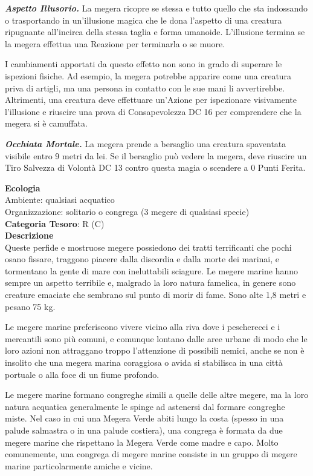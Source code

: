 \begin{multicols}{2}
{\emph{\textbf{Aspetto Illusorio.}} La megera ricopre se stessa e tutto quello che sta indossando o trasportando in un'illusione magica che le dona l'aspetto di una creatura ripugnante all'incirca della stessa taglia e forma umanoide. L'illusione termina se la megera effettua una Reazione per terminarla o se muore.

I cambiamenti apportati da questo effetto non sono in grado di superare le ispezioni fisiche. Ad esempio, la megera potrebbe apparire come una creatura priva di artigli, ma una persona in contatto con le sue mani li avvertirebbe. Altrimenti, una creatura deve effettuare un'Azione per ispezionare visivamente l'illusione e riuscire una prova di Consapevolezza DC 16 per comprendere che la megera si è camuffata.

\emph{\textbf{Occhiata Mortale.}} La megera prende a bersaglio una creatura spaventata visibile entro 9 metri da lei. Se il bersaglio può vedere la megera, deve riuscire un Tiro Salvezza di Volontà DC 13 contro questa magia o scendere a 0 Punti Ferita.

\textbf{Ecologia}\\
Ambiente: qualsiasi acquatico\\
Organizzazione: solitario o congrega (3 megere di qualsiasi specie)\\
\textbf{Categoria Tesoro}: R (C)\\
\textbf{Descrizione}\\
Queste perfide e mostruose megere possiedono dei tratti terrificanti che pochi osano fissare, traggono piacere dalla discordia e dalla morte dei marinai, e tormentano la gente di mare con ineluttabili sciagure. Le megere marine hanno sempre un aspetto terribile e, malgrado la loro natura famelica, in genere sono creature emaciate che sembrano sul punto di morir di fame. Sono alte 1,8 metri e pesano 75 kg.

Le megere marine preferiscono vivere vicino alla riva dove i pescherecci e i mercantili sono più comuni, e comunque lontano dalle aree urbane di modo che le loro azioni non attraggano troppo l'attenzione di possibili nemici, anche se non è insolito che una megera marina coraggiosa o avida si stabilisca in una città portuale o alla foce di un fiume profondo.

Le megere marine formano congreghe simili a quelle delle altre megere, ma la loro natura acquatica generalmente le spinge ad astenersi dal formare congreghe miste. Nel caso in cui una Megera Verde abiti lungo la costa (spesso in una palude salmastra o in una palude costiera), una congrega è formata da due megere marine che rispettano la Megera Verde come madre e capo. Molto comunemente, una congrega di megere marine consiste in un gruppo di megere marine particolarmente amiche e vicine.

}
\end{multicols}
